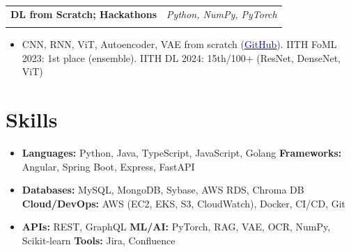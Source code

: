 \documentclass[11pt,a4paper]{article}
\makeatletter
\let\oldhref\href
\renewcommand{\href}[2]{\oldhref{#1}{\underline{\textcolor{blue}{#2}}}}
\newcommand{\resumeItem}[1]{\item\small{#1}}
\newlength{\resumeLeftCol}
\newlength{\resumeRightCol}
\newcommand{\resumeHeading}[4]{
  \begin{tabular*}{\textwidth}{@{}p{\resumeLeftCol}@{\extracolsep{\fill}}>{\raggedleft\arraybackslash}p{\resumeRightCol}@{}}
    \textbf{#1} & \textit{#2} \\
    & \textit{\ifstrempty{#4}{#3}{#3 \ #4}}
  \end{tabular*}
  \vspace{-2pt}
}
\makeatother
\begin{document}
\resumeHeading{DL from Scratch; Hackathons}{Python, NumPy, PyTorch}{}{}
\begin{itemize}[leftmargin=*,noitemsep,topsep=0pt]
    \resumeItem{CNN, RNN, ViT, Autoencoder, VAE from scratch (\href{https://github.com/kaulmesanyam/IITH_MTech/tree/main/Sem_2/DL}{GitHub}). IITH FoML 2023: 1st place (ensemble). IITH DL 2024: 15th/100+ (ResNet, DenseNet, ViT)}
\end{itemize}

\section{Skills}
\begin{itemize}[leftmargin=*,noitemsep,topsep=0pt]
    \resumeItem{\textbf{Languages:} Python, Java, TypeScript, JavaScript, Golang \quad \textbf{Frameworks:} Angular, Spring Boot, Express, FastAPI}
    \resumeItem{\textbf{Databases:} MySQL, MongoDB, Sybase, AWS RDS, Chroma DB \quad \textbf{Cloud/DevOps:} AWS (EC2, EKS, S3, CloudWatch), Docker, CI/CD, Git}
    \resumeItem{\textbf{APIs:} REST, GraphQL \quad \textbf{ML/AI:} PyTorch, RAG, VAE, OCR, NumPy, Scikit-learn \quad \textbf{Tools:} Jira, Confluence}
\end{itemize}
\end{document}
